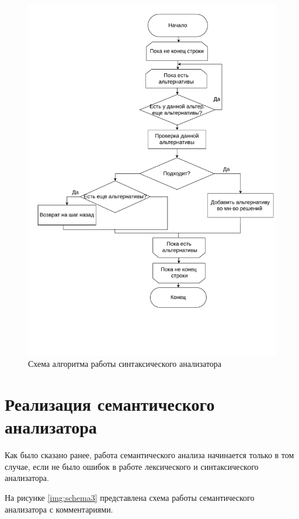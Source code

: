 \begin{figure}[h!]
	\begin{center}
		\includegraphics[scale=0.57]{./inc/img/schema2.pdf}
		\caption{Схема алгоритма работы синтаксического анализатора}
		\label{img:schema2}
	\end{center}
\end{figure}

\newpage

\section{Реализация семантического анализатора}

Как было сказано ранее, работа семантического анализа начинается только в том случае, если не было ошибок в работе лексического и синтаксического анализатора.

На рисунке \ref{img:schema3} представлена схема работы семантического анализатора с комментариями.

